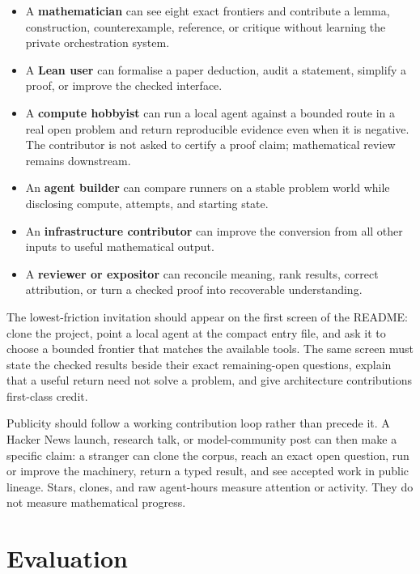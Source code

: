 \documentclass[10pt]{article}
\begin{document}
\begin{itemize}
\item A \textbf{mathematician} can see eight exact frontiers and contribute a
      lemma, construction, counterexample, reference, or critique without
      learning the private orchestration system.
\item A \textbf{Lean user} can formalise a paper deduction, audit a statement,
      simplify a proof, or improve the checked interface.
\item A \textbf{compute hobbyist} can run a local agent against a bounded route
      in a real open problem and return reproducible evidence even when it is
      negative.  The contributor is not asked to certify a proof claim;
      mathematical review remains downstream.
\item An \textbf{agent builder} can compare runners on a stable problem world
      while disclosing compute, attempts, and starting state.
\item An \textbf{infrastructure contributor} can improve the conversion from
      all other inputs to useful mathematical output.
\item A \textbf{reviewer or expositor} can reconcile meaning, rank results,
      correct attribution, or turn a checked proof into recoverable
      understanding.
\end{itemize}

The lowest-friction invitation should appear on the first screen of the
README: clone the project, point a local agent at the compact entry file, and
ask it to choose a bounded frontier that matches the available tools.  The
same screen must state the checked results beside their exact remaining-open
questions, explain that a useful return need not solve a problem, and give
architecture contributions first-class credit.

Publicity should follow a working contribution loop rather than precede it.
A Hacker News launch, research talk, or model-community post can then make a
specific claim: a stranger can clone the corpus, reach an exact open question,
run or improve the machinery, return a typed result, and see accepted work in
public lineage.  Stars, clones, and raw agent-hours measure attention or
activity.  They do not measure mathematical progress.

\section{Evaluation}\label{sec:evaluation}
\end{document}
